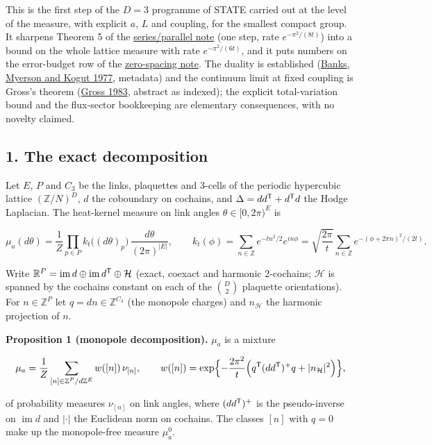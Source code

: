 \documentclass[11pt,a4paper]{article}
\begin{document}
This is the first step of the \(D=3\) programme of STATE carried out at
the level of the measure, with explicit \(a\), \(L\) and coupling, for
the smallest compact group. It sharpens Theorem 5 of the
\href{series-parallel-gauge-refinement.md}{series/parallel note} (one
step, rate \(e^{-\pi^2/(8t)}\)) into a bound on the whole lattice
measure with rate \(e^{-\pi^2/(6t)}\), and it puts numbers on the
error-budget row of the \href{zero-spacing-any-action.md}{zero-spacing
note}. The duality is established
(\href{https://doi.org/10.1016/0550-3213(77)90129-8}{Banks, Myerson and
Kogut 1977}, metadata) and the continuum limit at fixed coupling is
Gross's theorem (\href{https://doi.org/10.1007/BF01210842}{Gross 1983},
abstract as indexed); the explicit total-variation bound and the
flux-sector bookkeeping are elementary consequences, with no novelty
claimed.

\hypertarget{the-exact-decomposition}{%
\subsection{1. The exact decomposition}\label{the-exact-decomposition}}

Let \(E\), \(P\) and \(C_3\) be the links, plaquettes and 3-cells of the
periodic hypercubic lattice \((\mathbb Z/N)^D\), \(d\) the coboundary on
cochains, and \(\Delta=dd^{\sf T}+d^{\sf T}d\) the Hodge Laplacian. The
heat-kernel measure on link angles \(\theta\in[0,2\pi)^E\) is

\[\mu_a(d\theta)=\frac1Z\prod_{p\in P}k_t\bigl((d\theta)_p\bigr)\,
\frac{d\theta}{(2\pi)^{|E|}},\qquad
k_t(\phi)=\sum_{n\in\mathbb Z}e^{-tn^2/2}e^{in\phi}
=\sqrt{\frac{2\pi}t}\sum_{n\in\mathbb Z}e^{-(\phi+2\pi n)^2/(2t)}.\]

Write
\(\mathbb R^P=\operatorname{im}d\oplus\operatorname{im}d^{\sf T}\oplus\mathcal H\)
(exact, coexact and harmonic 2-cochains; \(\mathcal H\) is spanned by
the cochains constant on each of the \(\binom D2\) plaquette
orientations). For \(n\in\mathbb Z^P\) let \(q=dn\in\mathbb Z^{C_3}\)
(the monopole charges) and \(n_{\mathcal H}\) the harmonic projection of
\(n\).

\textbf{Proposition 1 (monopole decomposition).} \(\mu_a\) is a mixture

\[\mu_a=\frac1Z\sum_{[n]\in\mathbb Z^P/d\mathbb Z^E}
w([n])\,\nu_{[n]},\qquad
w([n])=\exp\Bigl\{-\frac{2\pi^2}t\Bigl(q^{\sf T}(dd^{\sf T})^+q
+|n_{\mathcal H}|^2\Bigr)\Bigr\},\]

of probability measures \(\nu_{[n]}\) on link angles, where
\((dd^{\sf T})^+\) is the pseudo-inverse on \(\operatorname{im}d\) and
\(|\cdot|\) the Euclidean norm on cochains. The classes \([n]\) with
\(q=0\) make up the monopole-free measure \(\mu_a^0\).
\end{document}
